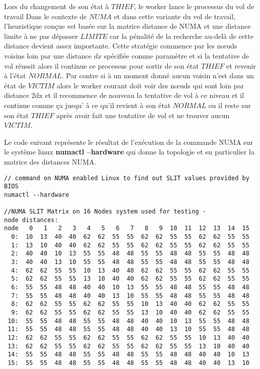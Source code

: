 Lors du changement de son état à $THIEF$, le worker lance le processus du vol de travail 
Dans le contexte de $NUMA$ et dans cette variante du vol de travail, l'heuristique conçue est basée sur la matrice distance de NUMA et une distance limite à ne pas dépasser $LIMITE$ car la pénalité de la recherche au-delà de cette distance devient assez importante. 
Cette stratégie commence par les nœuds voisins loin par une distance $dx$ spécifiée comme paramètre et si la tentative de vol réussit alors il continue ce processus pour sortir de son état $THIEF$ et revenir à l'état $NORMAL$. Par contre si à un moment donné aucun voisin n'est dans un état de $VICTIM$ alors le worker courant doit voir des nœuds qui sont loin par distance 2dx et il recommence de nouveau la tentative de vol à ce niveau et il continue comme ça jusqu' à ce qu'il revient à son état $NORMAL$ ou il reste sur son état $THIEF$ après avoir fait une tentative de vol et ne trouver aucun $VICTIM$.   

Le code suivant représente le résultat de l'exécution de la commande NUMA sur le système linux  \textbf{numactl --hardware} qui donne la topologie et en particulier la matrice des distances NUMA.
%
\begin{Verbatim}[formatcom=\color{blue}]
// command on NUMA enabled Linux to find out SLIT values provided by BIOS
numactl --hardware

//NUMA SLIT Matrix on 16 Nodes system used for testing - 
node distances:
node   0   1   2   3   4   5   6   7   8   9  10  11  12  13  14  15
  0:  10  13  40  40  62  62  55  55  62  62  55  55  62  62  55  55
  1:  13  10  40  40  62  62  55  55  62  62  55  55  62  62  55  55
  2:  40  40  10  13  55  55  48  48  55  55  48  48  55  55  48  48
  3:  40  40  13  10  55  55  48  48  55  55  48  48  55  55  48  48
  4:  62  62  55  55  10  13  40  40  62  62  55  55  62  62  55  55
  5:  62  62  55  55  13  10  40  40  62  62  55  55  62  62  55  55
  6:  55  55  48  48  40  40  10  13  55  55  48  48  55  55  48  48
  7:  55  55  48  48  40  40  13  10  55  55  48  48  55  55  48  48
  8:  62  62  55  55  62  62  55  55  10  13  40  40  62  62  55  55
  9:  62  62  55  55  62  62  55  55  13  10  40  40  62  62  55  55
 10:  55  55  48  48  55  55  48  48  40  40  10  13  55  55  48  48
 11:  55  55  48  48  55  55  48  48  40  40  13  10  55  55  48  48
 12:  62  62  55  55  62  62  55  55  62  62  55  55  10  13  40  40
 13:  62  62  55  55  62  62  55  55  62  62  55  55  13  10  40  40
 14:  55  55  48  48  55  55  48  48  55  55  48  48  40  40  10  13
 15:  55  55  48  48  55  55  48  48  55  55  48  48  40  40  13  10
\end{Verbatim}

